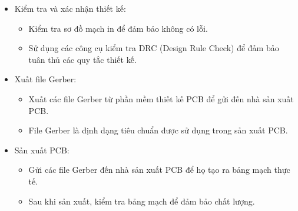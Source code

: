 \begin{itemize}
\begin{itemize}
                \end{itemize}
                \item Kiểm tra và xác nhận thiết kế:
                \begin{itemize}
                    \item Kiểm tra sơ đồ mạch in để đảm bảo không có lỗi.
                    \item Sử dụng các công cụ kiểm tra DRC (Design Rule Check) để đảm bảo tuân thủ các quy tắc thiết kế.
                \end{itemize}
                \item Xuất file Gerber:
                \begin{itemize}
                    \item Xuất các file Gerber từ phần mềm thiết kế PCB để gửi đến nhà sản xuất PCB.
                    \item File Gerber là định dạng tiêu chuẩn được sử dụng trong sản xuất PCB.
                \end{itemize}
                \item Sản xuất PCB:
                \begin{itemize}
                    \item Gửi các file Gerber đến nhà sản xuất PCB để họ tạo ra bảng mạch thực tế.
                    \item Sau khi sản xuất, kiểm tra bảng mạch để đảm bảo chất lượng.
                \end{itemize}
            \end{itemize}
